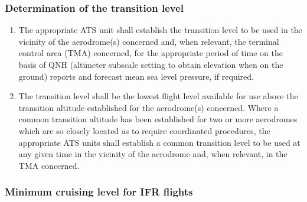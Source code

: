 \documentclass[../main.tex]{subfiles}
\begin{document}
    \subsubsection{Determination of the transition level}

    \begin{enumerate}
        \item The appropriate ATS unit shall establish the transition level to be used in the vicinity of the aerodrome(s) concerned and, when relevant, the terminal control area (TMA) concerned, for the appropriate period of time on the basis of QNH (altimeter subscale setting to obtain elevation when on the ground) reports and forecast mean sea level pressure, if required.
        \item The transition level shall be the lowest flight level available for use above the transition altitude established for the aerodrome(s) concerned. Where a common transition altitude has been established for two or more aerodromes which are so closely located as to require coordinated procedures, the appropriate ATS units shall establish a common transition level to be used at any given time in the vicinity of the aerodrome and, when relevant, in the TMA concerned.

    \end{enumerate}

    \subsubsection{Minimum cruising level for IFR flights}
\end{document}
